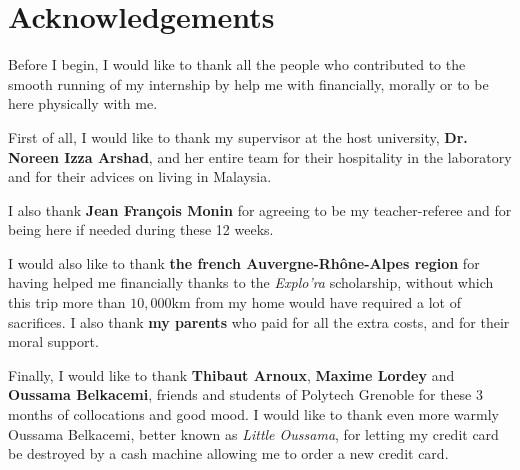 \chapter*{Acknowledgements}

Before I begin, I would like to thank all the people who contributed to the smooth running of my internship by help me with financially, morally or to be here physically with me.

First of all, I would like to thank my supervisor at the host university, \textbf{Dr. Noreen Izza Arshad}, and her entire team for their hospitality in the laboratory and for their advices on living in Malaysia.

I also thank \textbf{Jean François Monin} for agreeing to be my teacher-referee and for being here if needed during these 12 weeks.

I would also like to thank \textbf{the french Auvergne-Rhône-Alpes region} for having helped me financially thanks to the \textit{Explo'ra} scholarship, without which this trip more than $10,000$km from my home would have required a lot of sacrifices. I also thank \textbf{my parents} who paid for all the extra costs, and for their moral support.

Finally, I would like to thank \textbf{Thibaut Arnoux}, \textbf{Maxime Lordey} and \textbf{Oussama Belkacemi}, friends and students of Polytech Grenoble for these 3 months of collocations and good mood. I would like to thank even more warmly Oussama Belkacemi, better known as \textit{Little Oussama}, for letting my credit card be destroyed by a cash machine allowing me to order a new credit card.
